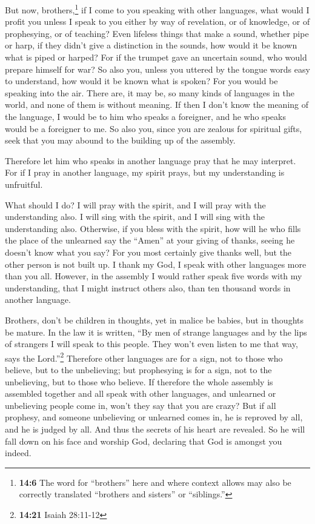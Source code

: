  But now, brothers,\footnote{\textbf{14:6} The word for
  ``brothers'' here and where context allows may also be correctly
  translated ``brothers and sisters'' or ``siblings.''} if I come to you
speaking with other languages, what would I profit you unless I speak to
you either by way of revelation, or of knowledge, or of prophesying, or
of teaching?  Even lifeless things that make a sound,
whether pipe or harp, if they didn't give a distinction in the sounds,
how would it be known what is piped or harped?  For if the
trumpet gave an uncertain sound, who would prepare himself for war?
 So also you, unless you uttered by the tongue words easy
to understand, how would it be known what is spoken? For you would be
speaking into the air.  There are, it may be, so many
kinds of languages in the world, and none of them is without meaning.
 If then I don't know the meaning of the language, I
would be to him who speaks a foreigner, and he who speaks would be a
foreigner to me.  So also you, since you are zealous for
spiritual gifts, seek that you may abound to the building up of the
assembly.

 Therefore let him who speaks in another language pray
that he may interpret.  For if I pray in another
language, my spirit prays, but my understanding is unfruitful.

 What should I do? I will pray with the spirit, and I
will pray with the understanding also. I will sing with the spirit, and
I will sing with the understanding also.  Otherwise, if
you bless with the spirit, how will he who fills the place of the
unlearned say the ``Amen'' at your giving of thanks, seeing he doesn't
know what you say?  For you most certainly give thanks
well, but the other person is not built up.  I thank my
God, I speak with other languages more than you all. 
However, in the assembly I would rather speak five words with my
understanding, that I might instruct others also, than ten thousand
words in another language.

 Brothers, don't be children in thoughts, yet in malice
be babies, but in thoughts be mature.  In the law it is
written, ``By men of strange languages and by the lips of strangers I
will speak to this people. They won't even listen to me that way, says
the Lord.''\footnote{\textbf{14:21} Isaiah 28:11-12} 
Therefore other languages are for a sign, not to those who believe, but
to the unbelieving; but prophesying is for a sign, not to the
unbelieving, but to those who believe.  If therefore the
whole assembly is assembled together and all speak with other languages,
and unlearned or unbelieving people come in, won't they say that you are
crazy?  But if all prophesy, and someone unbelieving or
unlearned comes in, he is reproved by all, and he is judged by all.
 And thus the secrets of his heart are revealed. So he
will fall down on his face and worship God, declaring that God is
amongst you indeed.

